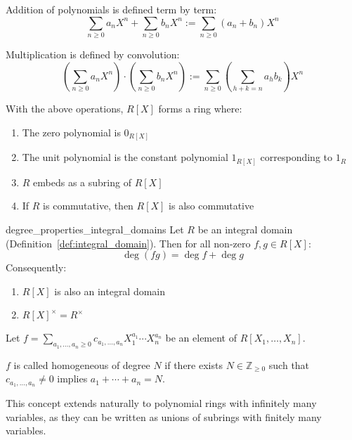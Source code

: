 \begin{definition}
  Addition of polynomials is defined term by term:
  \[
    \sum_{n \geq 0} a_nX^n + \sum_{n \geq 0} b_nX^n := \sum_{n \geq 0} (a_n + b_n)X^n
  \]

  Multiplication is defined by convolution:
  \[
    \left(\sum_{n \geq 0} a_nX^n\right) \cdot \left(\sum_{n \geq 0} b_nX^n\right) := \sum_{n \geq 0} \left(\sum_{h+k=n} a_hb_k\right)X^n
  \]
\end{definition}

\begin{proposition}
  With the above operations, $R[X]$ forms a ring where:
  \begin{enumerate}
    \item The zero polynomial is $0_{R[X]}$
    \item The unit polynomial is the constant polynomial $1_{R[X]}$ corresponding to $1_R$
    \item $R$ embeds as a subring of $R[X]$
    \item If $R$ is commutative, then $R[X]$ is also commutative
  \end{enumerate}
\end{proposition}

\begin{lemma}{degree_properties_integral_domains}
  Let $R$ be an integral domain (Definition~\ref{def:integral_domain}). Then for all non-zero $f,g \in R[X]$:
  \[
    \deg(fg) = \deg f + \deg g
  \]
  Consequently:
  \begin{enumerate}
    \item $R[X]$ is also an integral domain
    \item $R[X]^\times = R^\times$
  \end{enumerate}
\end{lemma}

\begin{definition}
  Let $f = \sum_{a_1,\ldots,a_n \geq 0} c_{a_1,\ldots,a_n} X_1^{a_1}\cdots X_n^{a_n}$ be an element of $R[X_1,\ldots,X_n]$.

  $f$ is called homogeneous of degree $N$ if there exists $N \in \mathbb{Z}_{\geq 0}$ such that $c_{a_1,\ldots,a_n} \neq 0$ implies $a_1 + \cdots + a_n = N$.
\end{definition}

\begin{remark}
  This concept extends naturally to polynomial rings with infinitely many variables, as they can be written as unions of subrings with finitely many variables.
\end{remark}

